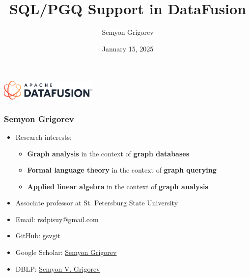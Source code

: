 \documentclass[xcolor=table,aspectratio=169]{beamer}
\title[SQL/PGQ for DataFusion]{SQL/PGQ Support in DataFusion}
\institute[SPbSU]{St. Petersburg State University}
\author[Semyon Grigorev]{Semyon Grigorev}
\date{January 15, 2025}
\begin{document}
{
\begin{frame}[fragile]
  \begin{table}
  \centering
  \includegraphics[height=1cm]{pictures/Untitled.png}
  \vfill
  \end{table}
  \vfill
  \titlepage
\end{frame}
}

\begin{frame}[fragile]
  \frametitle{Semyon Grigorev}
  \begin{minipage}{0.74\textwidth}
  \begin{itemize}    
    \item Research interests:
    \begin{itemize}    
      \item \textbf{Graph analysis} in the context of \textbf{graph databases}
      \item \textbf{Formal language theory} in the context of \textbf{graph querying}
      \item \textbf{Applied linear algebra} in the context of \textbf{graph analysis}
    \end{itemize}
    \item Associate professor at St. Petersburg State University
    \item Email: rsdpisuy@gmail.com 
    \item GitHub: \href{https://github.com/gsvgit}{gsvgit}
    \item Google Scholar: \href{https://scholar.google.com/citations?hl=ru&user=kP4dqUAAAAAJ&view_op=list_works&sortby=pubdate}{Semyon Grigorev}
    \item DBLP: \href{https://dblp.org/pid/181/9903.html}{Semyon V. Grigorev}
  \end{itemize}
\end{minipage}
\begin{minipage}[t]{0.24\textwidth}
  \begin{center}

\end{center}
\end{minipage}
\end{frame}
\end{document}
